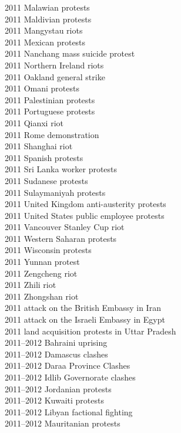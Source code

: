 2011 Malawian protests\\
2011 Maldivian protests\\
2011 Mangystau riots\\
2011 Mexican protests\\
2011 Nanchang mass suicide protest\\
2011 Northern Ireland riots\\
2011 Oakland general strike\\
2011 Omani protests\\
2011 Palestinian protests\\
2011 Portuguese protests\\
2011 Qianxi riot\\
2011 Rome demonstration\\
2011 Shanghai riot\\
2011 Spanish protests\\
2011 Sri Lanka worker protests\\
2011 Sudanese protests\\
2011 Sulaymaniyah protests\\
2011 United Kingdom anti-austerity protests\\
2011 United States public employee protests\\
2011 Vancouver Stanley Cup riot\\
2011 Western Saharan protests\\
2011 Wisconsin protests\\
2011 Yunnan protest\\
2011 Zengcheng riot\\
2011 Zhili riot\\
2011 Zhongshan riot\\
2011 attack on the British Embassy in Iran\\
2011 attack on the Israeli Embassy in Egypt\\
2011 land acquisition protests in Uttar Pradesh\\
2011–2012 Bahraini uprising\\
2011–2012 Damascus clashes\\
2011–2012 Daraa Province Clashes\\
2011–2012 Idlib Governorate clashes\\
2011–2012 Jordanian protests\\
2011–2012 Kuwaiti protests\\
2011–2012 Libyan factional fighting\\
2011–2012 Mauritanian protests\\
